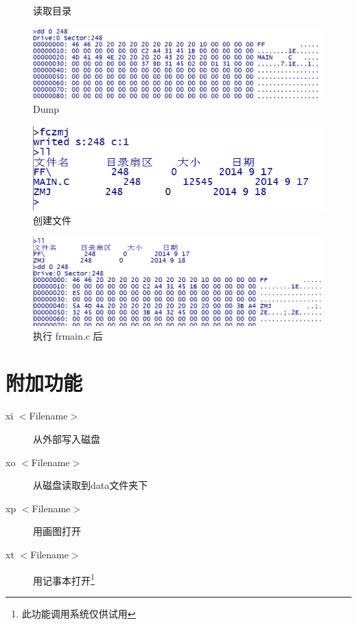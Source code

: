 \documentclass{report}
\begin{document}
\begin{CJK}{GBK}{hei}
\begin{figure}
  \caption{读取目录}
  \label{}
  \end{figure}
  \begin{figure}
  \centering
  \includegraphics[width=\textwidth]{dd.jpg}
  \caption{Dump}
  \label{}
  \end{figure}
  \begin{figure}
  \centering
  \includegraphics[width=\textwidth]{fc.jpg}
  \caption{创建文件}
  \label{}
  \end{figure}
  \begin{figure}
  \centering
  \includegraphics[width=\textwidth]{fr2.jpg}
  \caption{执行 frmain.c 后}
  \label{}
  \end{figure}
\pagebreak
\section{附加功能}
\begin{description}
  \item[xi $<$Filename$>$] 从外部写入磁盘
  \item[xo $<$Filename$>$] 从磁盘读取到data文件夹下
  \item[xp $<$Filename$>$] 用画图打开
  \item[xt $<$Filename$>$] 用记事本打开\footnote{此功能调用系统仅供试用}
\end{description}


\end{CJK}
\end{document}
